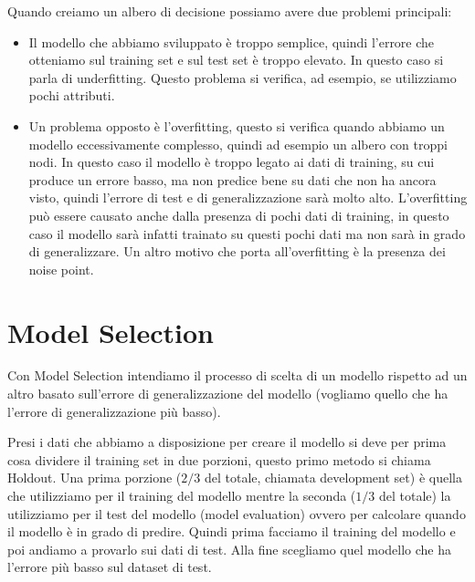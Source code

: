 \documentclass[14pt]{extreport}
\begin{document}
Quando creiamo un albero di decisione possiamo avere due problemi principali:

\begin{itemize}
    \item Il modello che abbiamo sviluppato è troppo semplice, quindi l'errore che otteniamo sul training set e sul test set è troppo elevato. In questo caso si parla di underfitting.
    Questo problema si verifica, ad esempio, se utilizziamo pochi attributi.
    \item Un problema opposto è l'overfitting, questo si verifica quando abbiamo un modello eccessivamente complesso, quindi ad esempio un albero con troppi nodi. In questo caso il modello è troppo legato ai dati di training, su cui produce un errore basso, ma non predice bene su dati che non ha ancora visto, quindi l'errore di test e di generalizzazione sarà molto alto.
    L'overfitting può essere causato anche dalla presenza di pochi dati di training, in questo caso il modello sarà infatti trainato su questi pochi dati ma non sarà in grado di generalizzare. Un altro motivo che porta all'overfitting è la presenza dei noise point.
\end{itemize}

\section{Model Selection}

Con Model Selection intendiamo il processo di scelta di un modello rispetto ad un altro basato sull'errore di generalizzazione del modello (vogliamo quello che ha l'errore di generalizzazione più basso).

Presi i dati che abbiamo a disposizione per creare il modello si deve per prima cosa dividere il training set in due porzioni, questo primo metodo si chiama Holdout. Una prima porzione ($2/3$ del totale, chiamata development set) è quella che utilizziamo per il training del modello mentre la seconda ($1/3$ del totale) la utilizziamo per il test del modello (model evaluation) ovvero per calcolare quando il modello è in grado di predire.
Quindi prima facciamo il training del modello e poi andiamo a provarlo sui dati di test.
Alla fine scegliamo quel modello che ha l'errore più basso sul dataset di test.
\end{document}
